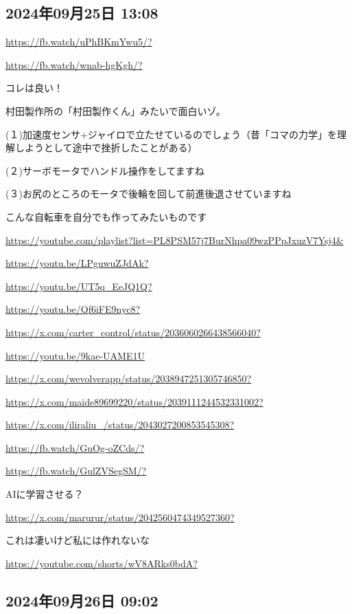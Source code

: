 \subsection*{2024年09月25日 13:08}

\url{https://fb.watch/uPhBKmYwu5/?}

\url{https://fb.watch/wnab-hgKgh/?}

コレは良い！

村田製作所の「村田製作くん」みたいで面白いゾ。

(１)加速度センサ+ジャイロで立たせているのでしょう（昔「コマの力学」を理解しようとして途中で挫折したことがある）

(２)サーボモータでハンドル操作をしてますね

(３)お尻のところのモータで後輪を回して前進後退させていますね

こんな自転車を自分でも作ってみたいものです

\url{https://youtube.com/playlist?list=PL8PSM57j7BurNhpa09wzPPpJxuzV7Ysj4&}

\url{https://youtu.be/LPguwuZJdAk?}

\url{https://youtu.be/UT5q_EeJQ1Q?}

\url{https://youtu.be/Qf6iFE9nyc8?}

\url{https://x.com/carter_control/status/2036060266438566040?}

\url{https://youtu.be/9kae-UAME1U}

\url{https://x.com/wevolverapp/status/2038947251305746850?}

\url{https://x.com/maide89699220/status/2039111244532331002?}

\url{https://x.com/iliraliu_/status/2043027200853545308?}

\url{https://fb.watch/GuOg-oZCds/?}

\url{https://fb.watch/GulZVSegSM/?}

AIに学習させる？

\url{https://x.com/marurur/status/2042560474349527360?}

これは凄いけど私には作れないな

\url{https://youtube.com/shorts/wV8ARks0bdA?}

\subsection*{2024年09月26日 09:02}

